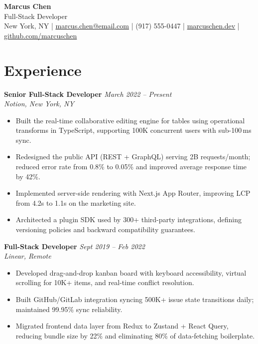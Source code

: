 \documentclass[11pt,a4paper]{article}
\begin{document}
\begin{center}
  {\LARGE \textbf{Marcus Chen}}\\[3pt]
  {\large \textcolor{accent}{Full-Stack Developer}}\\[4pt]
  New York, NY \quad|\quad
  \href{mailto:marcus.chen@email.com}{marcus.chen@email.com} \quad|\quad
  (917) 555-0447 \quad|\quad
  \href{https://marcuschen.dev}{marcuschen.dev} \quad|\quad
  \href{https://github.com/marcuschen}{github.com/marcuschen}
\end{center}

\section{Experience}

\noindent\textbf{Senior Full-Stack Developer} \hfill \textit{March 2022 -- Present}\\
\textit{Notion, New York, NY}
\begin{itemize}
  \item Built the real-time collaborative editing engine for tables using operational transforms in TypeScript, supporting 100K concurrent users with sub-100\,ms sync.
  \item Redesigned the public API (REST + GraphQL) serving 2B requests/month; reduced error rate from 0.8\% to 0.05\% and improved average response time by 42\%.
  \item Implemented server-side rendering with Next.js App Router, improving LCP from 4.2s to 1.1s on the marketing site.
  \item Architected a plugin SDK used by 300+ third-party integrations, defining versioning policies and backward compatibility guarantees.
\end{itemize}

\vspace{4pt}
\noindent\textbf{Full-Stack Developer} \hfill \textit{Sept 2019 -- Feb 2022}\\
\textit{Linear, Remote}
\begin{itemize}
  \item Developed drag-and-drop kanban board with keyboard accessibility, virtual scrolling for 10K+ items, and real-time conflict resolution.
  \item Built GitHub/GitLab integration syncing 500K+ issue state transitions daily; maintained 99.95\% sync reliability.
  \item Migrated frontend data layer from Redux to Zustand + React Query, reducing bundle size by 22\% and eliminating 80\% of data-fetching boilerplate.
\end{itemize}
\end{document}
